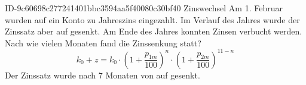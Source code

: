 \begin{exercise}
      {ID-9c60698c277241401bbc3594aa5f40080c30bf40}
      {Zinswechsel}
  \ifproblem\problem
    Am 1. Februar wurden  auf ein Konto zu 
    Jahreszins eingezahlt. Im Verlauf des Jahres wurde der Zinssatz aber
    auf  gesenkt. Am Ende des Jahres konnten  Zinsen
    verbucht werden. Nach wie vielen Monaten fand die Zinssenkung statt?
  \fi
  \ifoutline\outline
    \begin{equation*}
      k_{0}+z
      =
      k_{0}
      \cdot\left(1+\frac{p_{1m}}{100}\right)^{n}
      \cdot\left(1+\frac{p_{2m}}{100}\right)^{11-n}
    \end{equation*}
  \fi
  \ifoutcome\outcome
    Der Zinssatz wurde nach \num{7} Monaten von  auf 
    gesenkt.
  \fi
\end{exercise}
